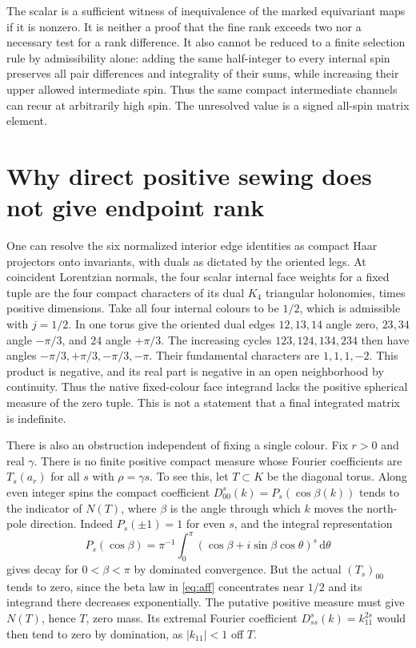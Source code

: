 \documentclass[11pt]{article}
\theoremstyle{remark}
\newcommand{\dd}{\mathrm d}
\begin{document}
The scalar is a sufficient witness of inequivalence of the marked equivariant maps if it is nonzero. It is neither a proof that the fine rank exceeds two nor a necessary test for a rank difference. It also cannot be reduced to a finite selection rule by admissibility alone: adding the same half-integer to every internal spin preserves all pair differences and integrality of their sums, while increasing their upper allowed intermediate spin. Thus the same compact intermediate channels can recur at arbitrarily high spin. The unresolved value is a signed all-spin matrix element.

\section{Why direct positive sewing does not give endpoint rank}
One can resolve the six normalized interior edge identities as compact Haar projectors onto invariants, with duals as dictated by the oriented legs. At coincident Lorentzian normals, the four scalar internal face weights for a fixed tuple are the four compact characters of its dual \(K_4\) triangular holonomies, times positive dimensions. Take all four internal colours to be \(1/2\), which is admissible with \(j=1/2\). In one torus give the oriented dual edges \(12,13,14\) angle zero, \(23,34\) angle \(-\pi/3\), and \(24\) angle \(+\pi/3\). The increasing cycles \(123,124,134,234\) then have angles \(-\pi/3,+\pi/3,-\pi/3,-\pi\). Their fundamental characters are \(1,1,1,-2\). This product is negative, and its real part is negative in an open neighborhood by continuity. Thus the native fixed-colour face integrand lacks the positive spherical measure of the zero tuple. This is not a statement that a final integrated matrix is indefinite.

There is also an obstruction independent of fixing a single colour. Fix \(r>0\) and real \(\gamma\). There is no finite positive compact measure whose Fourier coefficients are \(T_s(a_r)\) for all \(s\) with \(\rho=\gamma s\). To see this, let \(T\subset K\) be the diagonal torus. Along even integer spins the compact coefficient \(D^s_{00}(k)=P_s(\cos\beta(k))\) tends to the indicator of \(N(T)\), where \(\beta\) is the angle through which \(k\) moves the north-pole direction. Indeed \(P_s(\pm1)=1\) for even \(s\), and the integral representation
\[
 P_s(\cos\beta)=\pi^{-1}\int_0^\pi
   (\cos\beta+i\sin\beta\cos\theta)^s\,\dd\theta
\]
gives decay for \(0<\beta<\pi\) by dominated convergence. But the actual \((T_s)_{00}\) tends to zero, since the beta law in \eqref{eq:aff} concentrates near \(1/2\) and its integrand there decreases exponentially. The putative positive measure must give \(N(T)\), hence \(T\), zero mass. Its extremal Fourier coefficient \(D^s_{ss}(k)=k_{11}^{2s}\) would then tend to zero by domination, as \(|k_{11}|<1\) off \(T\).
\end{document}
